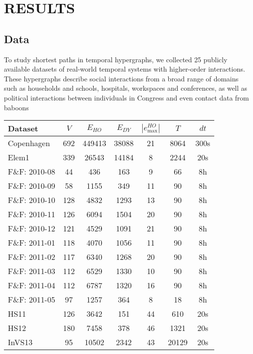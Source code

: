 \documentclass[a4paper,pre,reqno,superscriptaddress, twocolumn, floatfix]{revtex4}
\def\numdatasets{25 }
\def\ho{higher-order }
\begin{document}
\section*{RESULTS}

\subsection*{Data}
To study shortest paths in temporal hypergraphs, we collected \numdatasets publicly available datasets of real-world temporal systems with \ho interactions. These hypergraphs describe social interactions from a broad range of domains such as households and schools, hospitals, workspaces and conferences, as well as political interactions between individuals in Congress and even contact data from baboons 

\begin{table}[hb!]
    \begin{tabular}{lcccccc}
    \hline
    \textbf{Dataset} & {$V$} & {$E_{HO}$} & {$E_{DY}$} & {$|e_{\max}^{HO}|$} & {$T$} & {$dt$} \\ 
    \hline
    Copenhagen   & 692  & 449413 & 38088 & 21 & 8064  & 300s \\
    Elem1 & 339  & 26543  & 14184 & 8  & 2244  & 20s  \\
    F\&F: 2010-08  & 44   & 436  & 163   & 9  & 66  & 8h  \\
    F\&F: 2010-09  & 58   & 1155   & 349   & 11 & 90  & 8h  \\
    F\&F: 2010-10  & 128  & 4832   & 1293  & 13 & 90  & 8h  \\
    F\&F: 2010-11  & 126  & 6094   & 1504  & 20 & 90  & 8h  \\
    F\&F: 2010-12  & 121  & 4529   & 1091  & 21 & 90  & 8h  \\
    F\&F: 2011-01  & 118  & 4070   & 1056  & 11 & 90  & 8h  \\
    F\&F: 2011-02  & 117  & 6340   & 1268  & 20 & 90  & 8h  \\
    F\&F: 2011-03  & 112  & 6529   & 1330  & 10 & 90  & 8h  \\
    F\&F: 2011-04  & 112  & 6787   & 1320  & 16 & 90  & 8h  \\
    F\&F: 2011-05  & 97   & 1257   & 364   & 8  & 18  & 8h  \\
    HS11  & 126  & 3642   & 151   & 44 & 610   & 20s \\
    HS12  & 180  & 7458   & 378   & 46 & 1321  & 20s \\
    InVS13  & 95   & 10502  & 2342  & 43 & 20129 & 20s  \\

\end{tabular}
\end{table}
\end{document}
